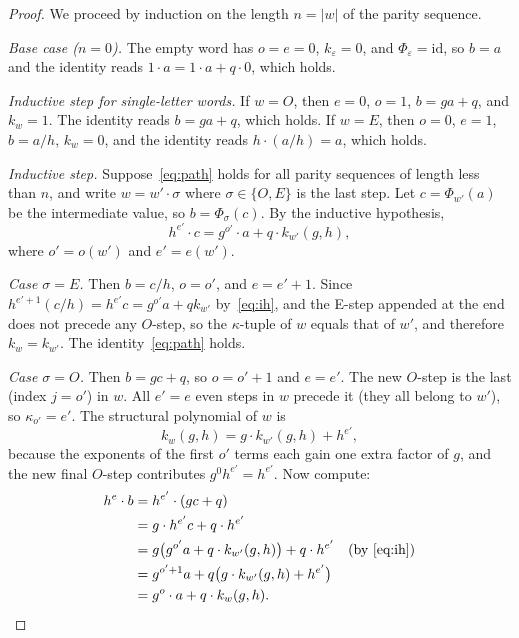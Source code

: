 \documentclass[12pt]{article}
\theoremstyle{definition}
\theoremstyle{remark}
\newcommand{\kpoly}{k}
\begin{document}
\begin{proof}
We proceed by induction on the length $n = |w|$ of the parity sequence.

\textit{Base case ($n = 0$).}  The empty word has $o = e = 0$,
$\kpoly_\varepsilon = 0$, and $\Phi_\varepsilon = \mathrm{id}$, so $b = a$
and the identity reads $1 \cdot a = 1 \cdot a + q \cdot 0$, which holds.

\textit{Inductive step for single-letter words.}
If $w = O$, then $e = 0$, $o = 1$, $b = ga + q$, and
$\kpoly_w = 1$.  The identity reads $b = ga + q$, which holds.
If $w = E$, then $o = 0$, $e = 1$, $b = a/h$, $\kpoly_w = 0$, and the
identity reads $h \cdot (a/h) = a$, which holds.

\textit{Inductive step.}  Suppose~\eqref{eq:path} holds for all parity
sequences of length less than $n$, and write $w = w' \cdot \sigma$ where
$\sigma \in \{O, E\}$ is the last step.  Let $c = \Phi_{w'}(a)$ be the
intermediate value, so $b = \Phi_\sigma(c)$.  By the inductive hypothesis,
\begin{equation}
  \label{eq:ih}
  h^{e'} \cdot c = g^{o'} \cdot a + q \cdot \kpoly_{w'}(g,h),
\end{equation}
where $o' = o(w')$ and $e' = e(w')$.

\textit{Case $\sigma = E$.}  Then $b = c/h$, $o = o'$, and $e = e' + 1$.
Since $h^{e'+1}(c/h) = h^{e'}c = g^{o'}a + q\kpoly_{w'}$ by~\eqref{eq:ih},
and the E-step appended at the end does not precede any $O$-step, so the
$\kappa$-tuple of $w$ equals that of $w'$, and therefore
$\kpoly_w = \kpoly_{w'}$.  The identity~\eqref{eq:path} holds.

\textit{Case $\sigma = O$.}  Then $b = gc + q$, so $o = o' + 1$ and $e = e'$.
The new $O$-step is the last (index $j = o' $) in $w$.  All $e' = e$
even steps in $w$ precede it (they all belong to $w'$), so $\kappa_{o'} = e'$.
The structural polynomial of $w$ is
\[
  \kpoly_w(g,h) = g\cdot\kpoly_{w'}(g,h) + h^{e'},
\]
because the exponents of the first $o'$ terms each gain one extra factor of
$g$, and the new final $O$-step contributes $g^0 h^{e'} = h^{e'}$.
Now compute:
\begin{align*}
  h^e \cdot b &= h^{e'}\cdot(gc + q) \\
              &= g \cdot h^{e'} c + q \cdot h^{e'} \\
              &= g\bigl(g^{o'} a + q\cdot\kpoly_{w'}(g,h)\bigr) + q\cdot h^{e'}
                 \quad\text{(by \eqref{eq:ih})} \\
              &= g^{o'+1} a + q\bigl(g\cdot\kpoly_{w'}(g,h) + h^{e'}\bigr) \\
              &= g^o \cdot a + q \cdot \kpoly_w(g,h). \qedhere
\end{align*}
\end{proof}
\end{document}
